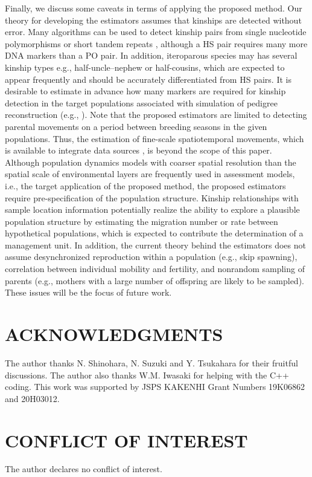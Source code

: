 \documentclass[12pt, English]{article}
\begin{document}
\begin{spacing}{1.9}
Finally, we discuss some caveats in terms of applying the proposed method. Our theory for developing the estimators assumes that kinships are detected without error. Many algorithms can be used to detect kinship pairs from single nucleotide polymorphisms or short tandem repeats \cite[e.g., ][]{Wang_2009Genetics, Huisman_2017}, although a HS pair requires many more DNA markers than a PO pair. In addition, iteroparous species may has several kinship types e.g., half-uncle--nephew or half-cousins, which are expected to appear frequently and should be accurately differentiated from HS pairs. It is desirable to estimate in advance how many markers are required for kinship detection in the target populations associated with simulation of pedigree reconstruction (e.g., \cite{Anderson_2020}). Note that the proposed estimators are limited to detecting parental movements on a period between breeding seasons in the given populations. Thus, the estimation of fine-scale spatiotemporal movements, which is available to integrate data sources \cite[]{Thorson_2021}, is beyond the scope of this paper. Although population dynamics models with coarser spatial resolution than the spatial scale of environmental layers are frequently used in assessment models, i.e., the target application of the proposed method, the proposed estimators require pre-specification of the population structure. Kinship relationships with sample location information potentially realize the ability to explore a plausible population structure by estimating the migration number or rate between hypothetical populations, which is expected to contribute the determination of a management unit. In addition, the current theory behind the estimators does not assume desynchronized reproduction within a population (e.g., skip spawning), correlation between individual mobility and fertility, and nonrandom sampling of parents (e.g., mothers with a large number of offspring are likely to be sampled). These issues will be the focus of future work.

\section*{ACKNOWLEDGMENTS}
The author thanks N. Shinohara, N. Suzuki and Y. Tsukahara for their fruitful discussions. The author also thanks W.M. Iwasaki for helping with the C{++} coding. This work was supported by JSPS KAKENHI Grant Numbers 19K06862 and 20H03012.

\section*{CONFLICT OF INTEREST}
The author declares no conflict of interest.


\end{spacing}
\end{document}
